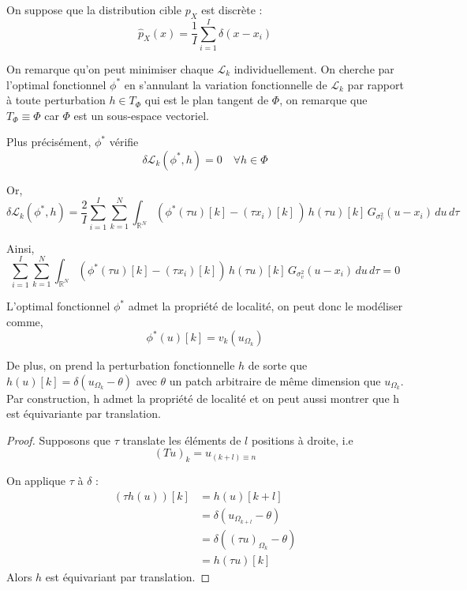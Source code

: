 \documentclass[a4paper,10pt]{article}
\theoremstyle{definition} %
\theoremstyle{definition} %
\theoremstyle{definition} %
\theoremstyle{definition} %
\newcommand{\R}{\mathbb{R}}
\begin{document}
On suppose que la  distribution cible $p_X$ est discrète :
\begin{equation*}
    \hat p_X(x) = \frac{1}{I}\sum\limits_{i=1}^I \delta(x-x_i)
\end{equation*}


On remarque qu'on peut minimiser chaque $\mathcal{L}_k$ individuellement. On cherche par l'optimal fonctionnel $\phi^*$ en s'annulant la variation fonctionnelle de $\mathcal{L}_k$ par rapport à toute perturbation $h \in T_\Phi$ qui est le plan tangent de $\Phi$, on remarque que $T_\Phi \equiv \Phi$ car $\Phi$ est un sous-espace vectoriel.

Plus précisément, $\phi^*$ vérifie 
\begin{equation*}
    \delta\mathcal{L}_k(\phi^*,h) = 0 \quad\forall h \in \Phi 
\end{equation*}

Or, 
\begin{equation*}
    \delta\mathcal{L}_k(\phi^*,h) = \frac{2}{I} \sum_{i=1}^{I} \sum_{k=1}^{N} \int_{\R^N}  \left(\phi^*(\tau u)[k] - (\tau x_i)[k]\,\right)\, h(\tau u)[k] \,G_{\sigma_v^2} (u - x_i) \, du \, d\tau
\end{equation*}

Ainsi,
\begin{equation*}
    \sum_{i=1}^{I} \sum_{k=1}^{N} \int_{\R^N} (\phi^*(\tau u)[k] - (\tau x_i)[k]) \,h(\tau u)[k] \,G_{\sigma_v^2} (u - x_i) \, du \, d\tau =0
\end{equation*}

L'optimal fonctionnel $\phi^*$ admet la propriété de localité, on peut donc le modéliser comme,
\begin{equation*}
    \phi^*(u)[k] = v_k(u_{\Omega_k})
\end{equation*}

De plus, on prend la perturbation fonctionnelle $h$ de sorte que $h(u)[k] = \delta (u_{\Omega_k} - \theta)$ avec $\theta$ un patch arbitraire de même dimension que $u_{\Omega_k}$. Par construction, h admet la propriété de localité et on peut aussi montrer que h est équivariante par translation.
\begin{proof}
    Supposons que $\tau$ translate les éléments de $l$ positions à droite, i.e
\[
(Tu)_k = u_{(k+l)\equiv n}
\]

On applique $\tau$ à $\delta$ :
\begin{align*}
    (\tau h(u)) [k] &= h(u)[k+l] \\
    &= \delta (u_{\Omega_{k+l}} - \theta)\\
    &= \delta ((\tau u)_{\Omega_k} - \theta)\\
    &= h (\tau u) [k]
\end{align*}
Alors $h$ est équivariant par translation.
\end{proof}
\end{document}
